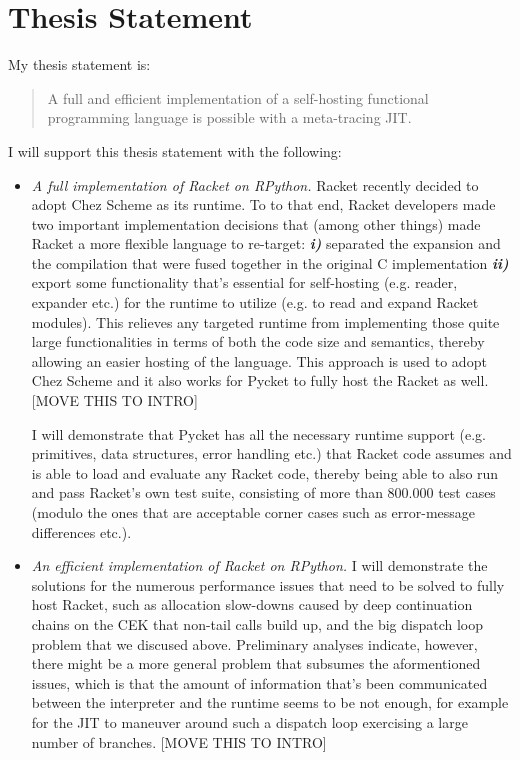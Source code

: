 \section{Thesis Statement}

My thesis statement is:

\begin{quote}
  A full and efficient implementation of a self-hosting functional
  programming language is possible with a meta-tracing JIT.
\end{quote}

I will support this thesis statement with the following:

\begin{itemize}
  \item \textit{A full implementation of Racket on RPython.} Racket
    recently decided to adopt Chez Scheme as its runtime. To to that
    end, Racket developers made two important implementation decisions
    that (among other things) made Racket a more flexible language to
    re-target: \textit{\textbf{i)}} separated the expansion and the
    compilation that were fused together in the original C
    implementation \textit{\textbf{ii)}} export some functionality
    that's essential for self-hosting (e.g. reader, expander etc.) for
    the runtime to utilize (e.g. to read and expand Racket
    modules). This relieves any targeted runtime from implementing
    those quite large functionalities in terms of both the code size
    and semantics, thereby allowing an easier hosting of the
    language. This approach is used to adopt Chez Scheme and it also
    works for Pycket to fully host the Racket as well. [MOVE THIS TO INTRO]

    I will demonstrate that Pycket has all the necessary runtime
    support (e.g. primitives, data structures, error handling etc.)
    that Racket code assumes and is able to load and evaluate any
    Racket code, thereby being able to also run and pass Racket's own
    test suite, consisting of more than 800.000 test cases (modulo the
    ones that are acceptable corner cases such as error-message
    differences etc.).
  \item \textit{An efficient implementation of Racket on RPython.} I
    will demonstrate the solutions for the numerous performance issues
    that need to be solved to fully host Racket, such as allocation
    slow-downs caused by deep continuation chains on the CEK that
    non-tail calls build up, and the big dispatch loop problem that we
    discused above. Preliminary analyses indicate, however, there
    might be a more general problem that subsumes the aformentioned
    issues, which is that the amount of information that's been
    communicated between the interpreter and the runtime seems to be
    not enough, for example for the JIT to maneuver around such a
    dispatch loop exercising a large number of branches. [MOVE THIS TO INTRO]


\end{itemize}
